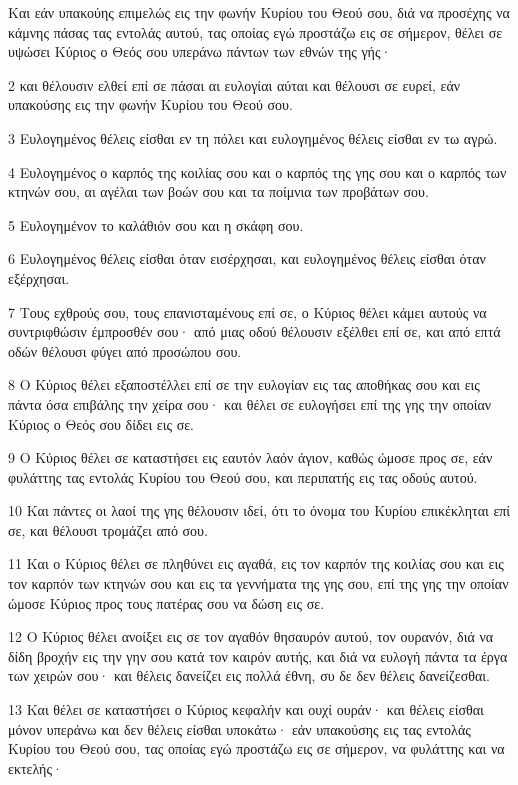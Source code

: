 \par Και εάν υπακούης επιμελώς εις την φωνήν Κυρίου του Θεού σου, διά να προσέχης να κάμνης πάσας τας εντολάς αυτού, τας οποίας εγώ προστάζω εις σε σήμερον, θέλει σε υψώσει Κύριος ο Θεός σου υπεράνω πάντων των εθνών της γής·
\par 2 και θέλουσιν ελθεί επί σε πάσαι αι ευλογίαι αύται και θέλουσι σε ευρεί, εάν υπακούσης εις την φωνήν Κυρίου του Θεού σου.
\par 3 Ευλογημένος θέλεις είσθαι εν τη πόλει και ευλογημένος θέλεις είσθαι εν τω αγρώ.
\par 4 Ευλογημένος ο καρπός της κοιλίας σου και ο καρπός της γης σου και ο καρπός των κτηνών σου, αι αγέλαι των βοών σου και τα ποίμνια των προβάτων σου.
\par 5 Ευλογημένον το καλάθιόν σου και η σκάφη σου.
\par 6 Ευλογημένος θέλεις είσθαι όταν εισέρχησαι, και ευλογημένος θέλεις είσθαι όταν εξέρχησαι.
\par 7 Τους εχθρούς σου, τους επανισταμένους επί σε, ο Κύριος θέλει κάμει αυτούς να συντριφθώσιν έμπροσθέν σου· από μιας οδού θέλουσιν εξέλθει επί σε, και από επτά οδών θέλουσι φύγει από προσώπου σου.
\par 8 Ο Κύριος θέλει εξαποστέλλει επί σε την ευλογίαν εις τας αποθήκας σου και εις πάντα όσα επιβάλης την χείρα σου· και θέλει σε ευλογήσει επί της γης την οποίαν Κύριος ο Θεός σου δίδει εις σε.
\par 9 Ο Κύριος θέλει σε καταστήσει εις εαυτόν λαόν άγιον, καθώς ώμοσε προς σε, εάν φυλάττης τας εντολάς Κυρίου του Θεού σου, και περιπατής εις τας οδούς αυτού.
\par 10 Και πάντες οι λαοί της γης θέλουσιν ιδεί, ότι το όνομα του Κυρίου επικέκληται επί σε, και θέλουσι τρομάζει από σου.
\par 11 Και ο Κύριος θέλει σε πληθύνει εις αγαθά, εις τον καρπόν της κοιλίας σου και εις τον καρπόν των κτηνών σου και εις τα γεννήματα της γης σου, επί της γης την οποίαν ώμοσε Κύριος προς τους πατέρας σου να δώση εις σε.
\par 12 Ο Κύριος θέλει ανοίξει εις σε τον αγαθόν θησαυρόν αυτού, τον ουρανόν, διά να δίδη βροχήν εις την γην σου κατά τον καιρόν αυτής, και διά να ευλογή πάντα τα έργα των χειρών σου· και θέλεις δανείζει εις πολλά έθνη, συ δε δεν θέλεις δανείζεσθαι.
\par 13 Και θέλει σε καταστήσει ο Κύριος κεφαλήν και ουχί ουράν· και θέλεις είσθαι μόνον υπεράνω και δεν θέλεις είσθαι υποκάτω· εάν υπακούσης εις τας εντολάς Κυρίου του Θεού σου, τας οποίας εγώ προστάζω εις σε σήμερον, να φυλάττης και να εκτελής·
